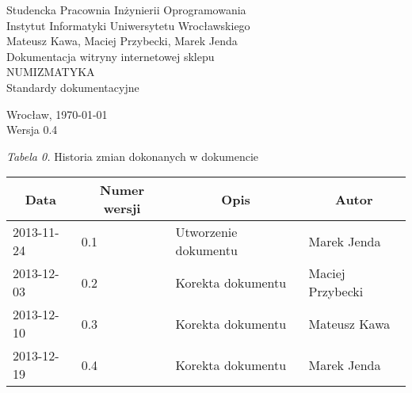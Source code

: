\documentclass 	[11pt, a4paper, leqno]	{article}					%
\newcommand{\newoddside}{								%
	\ifthenelse{ \NOT \isodd{\thepage} } {
	    \newpage
	} {
	    \newpage
	    \newpage
	}
}
\begin{document}

\begin{center}
	\thispagestyle{empty} %
	{\large Studencka Pracownia Inżynierii Oprogramowania} 		\\ [0.5cm]
	{\large Instytut Informatyki Uniwersytetu Wrocławskiego} 	\\ [6.0cm]

	{\large Mateusz Kawa, Maciej Przybecki, Marek Jenda} 		\\ [1.5cm]

	{\huge Dokumentacja witryny internetowej sklepu} 		\\ [0.5cm]
	{\huge NUMIZMATYKA} 						\\ [1.5cm]

	{\large Standardy dokumentacyjne} 				\\ [0.5cm]

	\vfill
	
	{\large Wrocław, \today}					\\ [0.5cm]
	{\large Wersja 0.4}
\end{center}

\newpage


\textit{Tabela 0.} Historia zmian dokonanych w dokumencie

\begin{center}
	\begin{tabular}{| l | l | l | l |}
		\hline
		\multicolumn{1}{|c|}{Data} & 
		\multicolumn{1}{|c|}{Numer wersji} &  
		\multicolumn{1}{|c|}{Opis} &
		\multicolumn{1}{|c|}{Autor} 				 \\ \hline \hline
		2013-11-24 & 0.1 & Utworzenie dokumentu & Marek Jenda	 \\ \hline
		2013-12-03 & 0.2 & Korekta dokumentu & Maciej Przybecki	 \\ \hline
		2013-12-10 & 0.3 & Korekta dokumentu & Mateusz Kawa	 \\ \hline
		2013-12-19 & 0.4 & Korekta dokumentu & Marek Jenda	 \\ \hline
	\end{tabular}
\end{center} 

\medskip %


\tableofcontents

\newoddside
\end{document}

